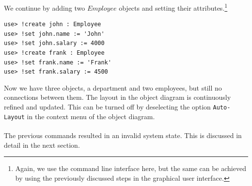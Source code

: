 \documentclass[a4paper,titlepage,oneside,final]{scrreprt} %
\begin{document}
We continue by adding two $\mathit{Employee}$ objects and setting their attributes.\footnote{Again,
we use the command line interface here, but the same can be
achieved by using the previously discussed steps in the graphical user interface.}
\begin{verbatim}
use> !create john : Employee
use> !set john.name := 'John'
use> !set john.salary := 4000
use> !create frank : Employee
use> !set frank.name := 'Frank'
use> !set frank.salary := 4500
\end{verbatim}
Now we have three objects, a department and two employees,
but still no connections between them. The layout in the object
diagram is continuously refined and updated. This can be turned off
by deselecting the option \verb+Auto-Layout+ in the context menu of the object diagram.\\\\
The previous commands resulted in an invalid system state.
This is discussed in detail in the next section.
\end{document}
